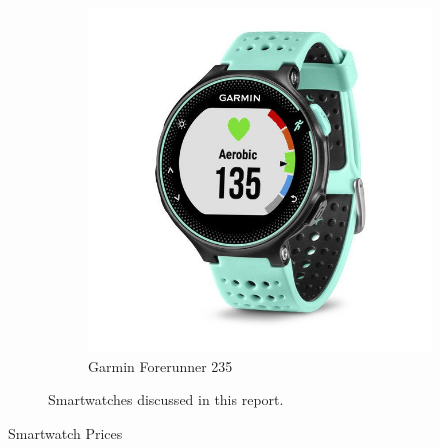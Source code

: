 \begin{figure}[h]
\begin{subfigure}{.5\textwidth}
        \includegraphics[width=.4\linewidth]{media/garmin_pic.jpeg}
        \caption{Garmin Forerunner 235 \cite{garmin_price}}
        \label{fig:sub3}
      \end{subfigure}
    \caption{Smartwatches discussed in this report.}
    \label{watches:pictures}
\end{figure}


\begin{table}[h]
    \centering
    \caption{Smartwatch Prices}
    \label{watch:price} 
\end{table}






